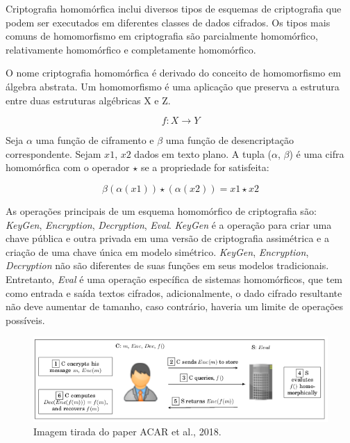 \documentclass{ufsctex/ufsctex}
\begin{document}
Criptografia homomórfica inclui diversos tipos de esquemas de criptografia que
podem ser executados em diferentes classes de dados cifrados. Os tipos mais
comuns de homomorfismo em criptografia são parcialmente homomórfico,
relativamente homomórfico e completamente homomórfico.\cite{survey-homo}

O nome criptografia homomórfica é derivado do conceito de homomorfismo em
álgebra abstrata. Um homomorfismo é uma aplicação que preserva a estrutura
entre duas estruturas algébricas X e Z.

\begin{equation}
f : X \longrightarrow Y
\end{equation}

Seja $\alpha$ uma função de ciframento e $\beta$ uma função de desencriptação
correspondente. Sejam $x1$, $x2$ dados em texto plano. A tupla ($\alpha$,
$\beta$) é uma cifra homomórfica com o operador $\star$ se a propriedade for
satisfeita:

\begin{equation}
\beta (\alpha(x1)) \star (\alpha(x2)) = x1 \star x2
\end{equation}

As operações principais de um esquema homomórfico de criptografia são:
\textit{KeyGen}, \textit{Encryption}, \textit{Decryption}, \textit{Eval}.
\textit{KeyGen} é a operação para criar uma chave pública e outra privada em uma
versão de criptografia assimétrica e a criação de uma chave única em modelo
simétrico. \textit{KeyGen}, \textit{Encryption}, \textit{Decryption} não são
diferentes de suas funções em seus modelos tradicionais.  Entretanto,
\textit{Eval} é uma operação específica de sistemas homomórficos, que tem como
entrada e saída textos cifrados, adicionalmente, o dado cifrado resultante não
deve aumentar de tamanho, caso contrário, haveria um limite de operações
possíveis.\cite{survey-homo}

\begin{figure}[h]
	\centering
	\includegraphics[scale=0.4]{crypto-homo}
	\caption{Imagem tirada do paper ACAR et al., 2018.}
	\label{fig:crypto-homo}
\end{figure}
\end{document}
